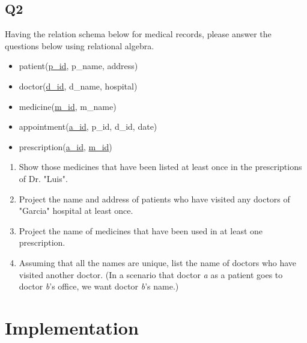 \documentclass{homework}
\begin{document}
\subsection*{Q2}
Having the relation schema below for medical records, please answer the questions below using relational algebra.
\begin{itemize}[label=]
    \item patient(\underline{p\_id}, p\_name, address)
    \item doctor(\underline{d\_id}, d\_name, hospital)
    \item medicine(\underline{m\_id}, m\_name)
    \item appointment(\underline{a\_id}, p\_id, d\_id, date)
    \item prescription(\underline{a\_id}, \underline{m\_id})
\end{itemize}
\begin{enumerate}[label=\alph*)]
    \item Show those medicines that have been listed at least once in the prescriptions of Dr. "Luis".
    \item Project the name and address of patients who have visited any doctors of "Garcia" hospital at least once.
    \item Project the name of medicines that have been used in at least one prescription.
    \item Assuming that all the names are unique, list the name of doctors who have visited another doctor. (In a scenario that doctor \textit{a} as a patient goes to doctor \textit{b}'s office, we want doctor \textit{b}'s name.)
\end{enumerate}

\section{Implementation}
\end{document}
